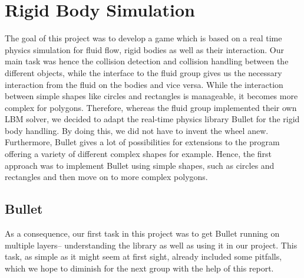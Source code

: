 \section{Rigid Body Simulation}

The goal of this project was to develop a game which is based on a real time physics simulation for fluid flow, rigid bodies as well as their interaction. Our main task was hence the collision detection and collision handling between the different objects, while the interface to the fluid group gives us the necessary interaction from the fluid on the bodies and vice versa. While the interaction between simple shapes like circles and rectangles is manageable, it becomes more complex for polygons. Therefore, whereas the fluid group implemented their own LBM solver, we decided to adapt the real-time physics library Bullet \cite{Bullet} for the rigid body handling. By doing this, we did not have to invent the wheel anew. Furthermore, Bullet gives a lot of possibilities for extensions to the program offering a variety of different complex shapes for example. Hence, the first approach was to implement Bullet using simple shapes, such as circles and rectangles and then move on to more complex polygons.

\subsection{Bullet}
As a consequence, our first task in this project was to get Bullet running on multiple layers-- understanding the library as well as using it in our project. This task, as simple as it might seem at first sight, already included some pitfalls, which we hope to diminish for the next group with the help of this report. 
